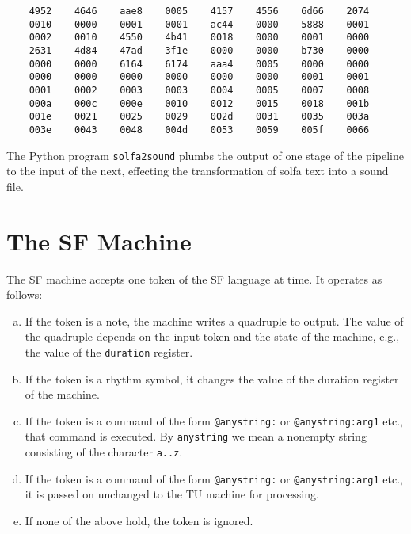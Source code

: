 \documentclass[11pt]{amsart}
\begin{document}
\begin{verbatim}
    4952    4646    aae8    0005    4157    4556    6d66    2074
    0010    0000    0001    0001    ac44    0000    5888    0001
    0002    0010    4550    4b41    0018    0000    0001    0000
    2631    4d84    47ad    3f1e    0000    0000    b730    0000
    0000    0000    6164    6174    aaa4    0005    0000    0000
    0000    0000    0000    0000    0000    0000    0001    0001
    0001    0002    0003    0003    0004    0005    0007    0008
    000a    000c    000e    0010    0012    0015    0018    001b
    001e    0021    0025    0029    002d    0031    0035    003a
    003e    0043    0048    004d    0053    0059    005f    0066
\end{verbatim}


The Python program {\tt solfa2sound} plumbs the output of one stage of the pipeline to the input of the next, effecting the transformation of solfa text into a sound file.



\section{The SF Machine}

The SF machine accepts one token of the SF language at time. It operates as follows:

\begin{enumerate}[(a)]

	\item If the token is a note, the machine writes a quadruple to output.  The value of the quadruple
	depends on the input token and the state of the machine, e.g., the value of the {\tt duration} register.
	
	\item If the token is a rhythm symbol, it changes the value of the duration register of the machine.
	
	\item If the token is a command of the form {\tt @anystring:} or 
	{\tt @anystring:arg1} etc., that command is executed.  By {\tt anystring} we mean 
	a nonempty string consisting of the character {\tt a..z}.
	
	\item If the token is a command of the form {\tt @anystring:} or {\tt @anystring:arg1} etc.,
	it is passed on unchanged to the TU machine for processing.
	
	\item If none of the above hold, the token is ignored.

\end{enumerate}
\end{document}
